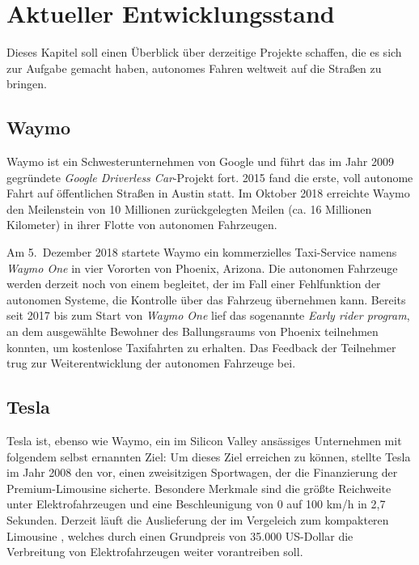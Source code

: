 \chapter{Aktueller Entwicklungsstand}

Dieses Kapitel soll einen Überblick über derzeitige Projekte schaffen, die es sich zur Aufgabe gemacht haben, autonomes Fahren weltweit auf die Straßen zu bringen.

\section{Waymo}

Waymo ist ein Schwesterunternehmen von Google und führt das im Jahr 2009 gegründete \textit{Google Driverless Car}-Projekt fort. 2015 fand die erste, voll autonome Fahrt auf öffentlichen Straßen in Austin statt. Im Oktober 2018 erreichte Waymo den Meilenstein von 10 Millionen zurückgelegten Meilen (ca. 16 Millionen Kilometer) in ihrer Flotte von autonomen Fahrzeugen.

Am 5.\ Dezember 2018 startete Waymo ein kommerzielles Taxi-Service namens \textit{Waymo One} in vier Vororten von Phoenix, Arizona. Die autonomen Fahrzeuge werden derzeit noch von einem  begleitet, der im Fall einer Fehlfunktion der autonomen Systeme, die Kontrolle über das Fahrzeug übernehmen kann.
 Bereits seit 2017 bis zum Start von \textit{Waymo One} lief das sogenannte \textit{Early rider program}, an dem ausgewählte Bewohner des Ballungsraums von Phoenix teilnehmen konnten, um kostenlose Taxifahrten zu erhalten. Das Feedback der Teilnehmer trug zur Weiterentwicklung der autonomen Fahrzeuge bei.


\section{Tesla}

Tesla ist, ebenso wie Waymo, ein im Silicon Valley ansässiges Unternehmen mit folgendem selbst ernannten Ziel:  Um dieses Ziel erreichen zu können, stellte Tesla im Jahr 2008 den  vor, einen zweisitzigen Sportwagen, der die Finanzierung der Premium-Limousine  sicherte. Besondere Merkmale sind die größte Reichweite unter Elektrofahrzeugen und eine Beschleunigung von 0 auf 100 \si[per-mode=symbol]{\kilo\metre\per\hour} in 2,7 Sekunden. Derzeit läuft die Auslieferung der im Vergeleich zum  kompakteren Limousine , welches durch einen Grundpreis von 35.000 US-Dollar die Verbreitung von Elektrofahrzeugen weiter vorantreiben soll.

